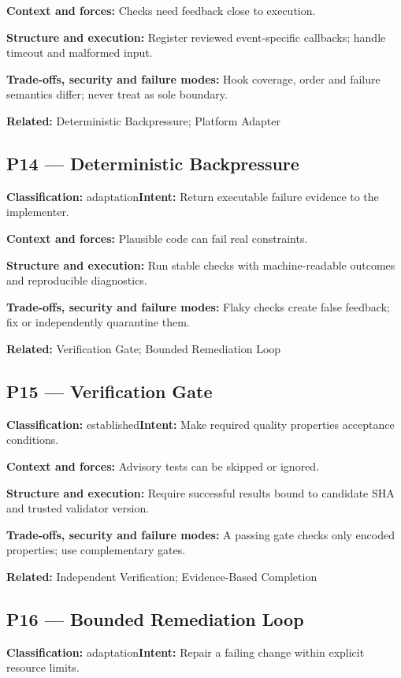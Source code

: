 \documentclass[11pt,letterpaper]{article}
\begin{document}
\textbf{Context and forces:} Checks need feedback close to execution.

\textbf{Structure and execution:} Register reviewed event-specific callbacks; handle timeout and malformed input.

\textbf{Trade-offs, security and failure modes:} Hook coverage, order and failure semantics differ; never treat as sole boundary.

\textbf{Related:} Deterministic Backpressure; Platform Adapter

\subsection*{P14 --- Deterministic Backpressure}
\textbf{Classification:} adaptation\quad\textbf{Intent:} Return executable failure evidence to the implementer.

\textbf{Context and forces:} Plausible code can fail real constraints.

\textbf{Structure and execution:} Run stable checks with machine-readable outcomes and reproducible diagnostics.

\textbf{Trade-offs, security and failure modes:} Flaky checks create false feedback; fix or independently quarantine them.

\textbf{Related:} Verification Gate; Bounded Remediation Loop

\subsection*{P15 --- Verification Gate}
\textbf{Classification:} established\quad\textbf{Intent:} Make required quality properties acceptance conditions.

\textbf{Context and forces:} Advisory tests can be skipped or ignored.

\textbf{Structure and execution:} Require successful results bound to candidate SHA and trusted validator version.

\textbf{Trade-offs, security and failure modes:} A passing gate checks only encoded properties; use complementary gates.

\textbf{Related:} Independent Verification; Evidence-Based Completion

\subsection*{P16 --- Bounded Remediation Loop}
\textbf{Classification:} adaptation\quad\textbf{Intent:} Repair a failing change within explicit resource limits.
\end{document}
